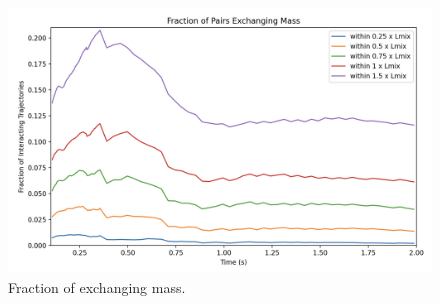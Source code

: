 \begin{figure}
\label{fig:frac_exchanging}
\includegraphics[width=\textwidth]{chapters/3/figures/frac_exchanging.png}
\caption{Fraction of exchanging mass.}
\end{figure}